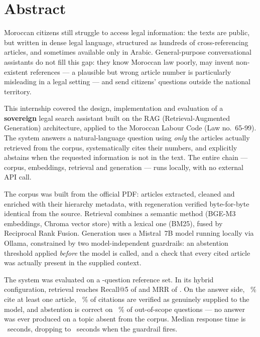 \chapter*{Abstract}

Moroccan citizens still struggle to access legal information: the texts are public, but written
in dense legal language, structured as hundreds of cross-referencing articles, and sometimes
available only in Arabic. General-purpose conversational assistants do not fill this gap: they
know Moroccan law poorly, may invent non-existent references --- a plausible but wrong article
number is particularly misleading in a legal setting --- and send citizens' questions outside
the national territory.

This internship covered the design, implementation and evaluation of a \textbf{sovereign} legal
search assistant built on the RAG (Retrieval-Augmented Generation) architecture, applied to the
Moroccan Labour Code (Law no.~65-99). The system answers a natural-language question using
\emph{only} the articles actually retrieved from the corpus, systematically cites their numbers,
and explicitly abstains when the requested information is not in the text. The entire chain ---
corpus, embeddings, retrieval and generation --- runs locally, with no external API call.

The corpus was built from the official PDF: \NbArticles{} articles extracted, cleaned and
enriched with their hierarchy metadata, with regeneration verified byte-for-byte identical from
the source. Retrieval combines a semantic method (BGE-M3 embeddings, Chroma vector store) with a
lexical one (BM25), fused by Reciprocal Rank Fusion. Generation uses a Mistral~7B model running
locally via Ollama, constrained by two model-independent guardrails: an abstention threshold
applied \emph{before} the model is called, and a check that every cited article was actually
present in the supplied context.

The system was evaluated on a \NbQuestions-question reference set. In its hybrid configuration,
retrieval reaches Recall@5 of \RecallHybride{} and MRR of \MrrHybride{}. On the answer side,
\TauxCitation~\% cite at least one article, \TauxVerif~\% of citations are verified as genuinely
supplied to the model, and abstention is correct on \TauxAbstention~\% of out-of-scope questions
--- no answer was ever produced on a topic absent from the corpus. Median response time is
\LatTotale~seconds, dropping to \LatAbstention~seconds when the guardrail fires.

